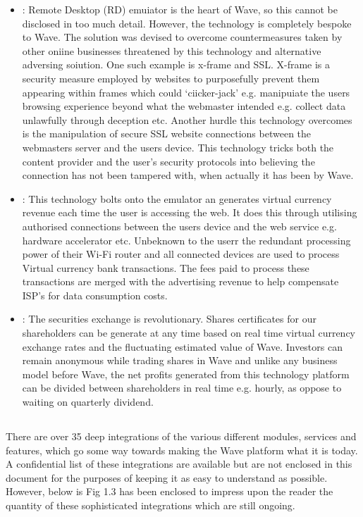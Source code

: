 \documentclass[letterpaper,10pt,openany,oneside,english]{sphinxmanual}
\begin{document}
\begin{itemize}
\item {} 
: Remote Desktop (RD) emuiator is the heart of Wave, so this cannot be disclosed in too much detail. However, the technology is completely bespoke to Wave. The solution was devised to overcome countermeasures taken by other oniine businesses threatened by this technology and alternative adversing soiution. One such example is x-frame and SSL. X-frame is a security measure employed by websites to purposefully prevent them appearing within frames which could ‘ciicker-jack’ e.g. manipuiate the users browsing experience beyond what the webmaster intended e.g. collect data unlawfully through deception etc. Another hurdle this technology overcomes is the manipulation of secure SSL website connections between the webmasters server and the users device. This technology tricks both the content provider and the user’s security protocols into believing the connection has not been tampered with, when actually it has been by Wave.

\item {} 
: This technology bolts onto the emulator an generates virtual currency revenue each time the user is accessing the web. It does this through utilising authorised connections between the users device and the web service e.g. hardware accelerator etc. Unbeknown to the userr the redundant processing power of their Wi-Fi router and all connected devices are used to process Virtual currency bank transactions. The fees paid to process these transactions are merged with the advertising revenue to help compensate ISP’s for data consumption costs.

\item {} 
: The securities exchange is revolutionary. Shares certificates for our shareholders can be generate at any time based on real time virtual currency exchange rates and the fluctuating estimated value of Wave. Investors can remain anonymous while trading shares in Wave and unlike any business model before Wave, the net profits generated from this technology platform can be divided between shareholders in real time e.g. hourly, as oppose to waiting on quarterly dividend.

\end{itemize}


\subsection{}
\label{\detokenize{overview:systems-integration}}
There are over 35 deep integrations of the various different modules, services and features, which go some way towards making the Wave platform what it is today. A confidential list of these integrations are available but are not enclosed in this document for the purposes of keeping it as easy to understand as possible. However, below is Fig 1.3 has been enclosed to impress upon the reader the quantity of these sophisticated integrations which are still ongoing.
\end{document}
